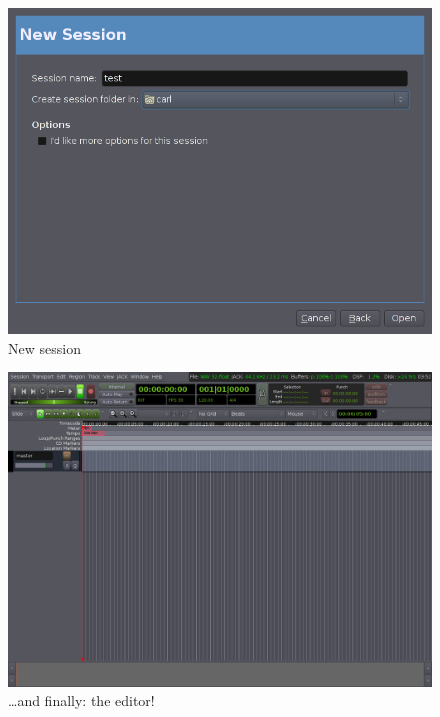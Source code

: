 \documentclass{book}
\begin{document}
\begin{figure}[ht]
\begin{center}
\includegraphics[scale=0.5]{screenshots/new-session.png}
\end{center}
\caption{New session}
\label{fig:new-session}
\end{figure}

\begin{figure}[ht]
\begin{center}
\includegraphics[scale=0.3]{screenshots/editor.png}
\end{center}
\caption{\ldots and finally: the editor!}
\label{fig:editor}
\end{figure}
\end{document}
